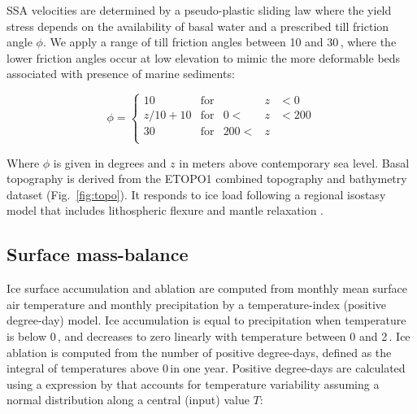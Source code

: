 SSA velocities are determined by a pseudo-plastic sliding law where the yield stress depends on the availability of basal water and a prescribed till friction angle $\phi$. We apply a range of till friction angles between 10 and 30\,\degree, where the lower friction angles occur at low elevation to mimic the more deformable beds associated with presence of marine sediments:

\begin{equation}
	\phi = \left\{\begin{array}{llrll}
		10      & \mathrm{for} &      &z&<  0 \\
		z/10+10 & \mathrm{for} &   0 <&z&<200 \\
		30      & \mathrm{for} & 200 <&z&     \\
	\end{array}\right.
\end{equation}

Where $\phi$ is given in degrees and $z$ in meters above contemporary sea level. Basal topography is derived from the ETOPO1\citep{data:etopo1} combined topography and bathymetry dataset (Fig.~\ref{fig:topo}). It responds to ice load following a regional isostasy model that includes lithospheric flexure and mantle relaxation \citep{lingle-clark-1985}.


\subsection{Surface mass-balance}

Ice surface accumulation and ablation are computed from monthly mean surface air temperature and monthly precipitation by a temperature-index (positive degree-day) model\citep{hock-2003}. Ice accumulation is equal to precipitation when temperature is below 0\,\degC, and decreases to zero linearly with temperature between 0 and 2\,\degC. Ice ablation is computed from the number of positive degree-days, defined as the integral of temperatures above 0\,\degC in one year. Positive degree-days are calculated using a expression by \citet{calov-greve-2005} that accounts for temperature variability assuming a normal distribution along a central (input) value $T$:

